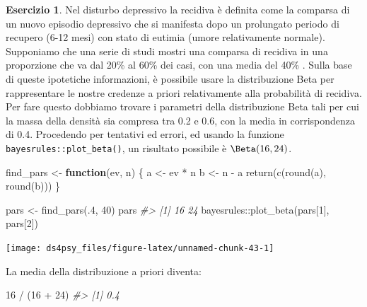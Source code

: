 \documentclass[
  11pt,
]{krantz}
\makeatletter
\newenvironment{Shaded}{\begin{snugshade}}{\end{snugshade}}
\newcommand{\CommentTok}[1]{\textcolor[rgb]{0.37,0.37,0.37}{\textit{#1}}}
\newcommand{\ControlFlowTok}[1]{\textcolor[rgb]{0.27,0.27,0.27}{\textbf{#1}}}
\newcommand{\DecValTok}[1]{\textcolor[rgb]{0.06,0.06,0.06}{#1}}
\newcommand{\FunctionTok}[1]{\textcolor[rgb]{0,0,0}{#1}}
\newcommand{\NormalTok}[1]{#1}
\newcommand{\OtherTok}[1]{\textcolor[rgb]{0.37,0.37,0.37}{#1}}
\newcommand{\SpecialCharTok}[1]{\textcolor[rgb]{0,0,0}{#1}}
\newenvironment{kframe}{%
\medskip{}
\setlength{\fboxsep}{.8em}
 \def\at@end@of@kframe{}%
 \ifinner\ifhmode%
  \def\at@end@of@kframe{\end{minipage}}%
  \begin{minipage}{\columnwidth}%
 \fi\fi%
 \def\FrameCommand##1{\hskip\@totalleftmargin \hskip-\fboxsep
 \colorbox{shadecolor}{##1}\hskip-\fboxsep
     \hskip-\linewidth \hskip-\@totalleftmargin \hskip\columnwidth}%
 \MakeFramed {\advance\hsize-\width
   \@totalleftmargin\z@ \linewidth\hsize
   \@setminipage}}%
 {\par\unskip\endMakeFramed%
 \at@end@of@kframe}
\renewenvironment{Shaded}{\begin{kframe}}{\end{kframe}}
\theoremstyle{definition}
\theoremstyle{definition}
\theoremstyle{definition}
\newtheorem{exercise}{Esercizio}[chapter]
\theoremstyle{definition}
\theoremstyle{remark}
\makeatother
\begin{document}
\begin{exercise}
Nel disturbo depressivo la recidiva è definita come la comparsa di un nuovo episodio depressivo che si manifesta dopo un prolungato periodo di recupero (6-12 mesi) con stato di eutimia (umore relativamente normale). Supponiamo che una serie di studi mostri una comparsa di recidiva in una proporzione che va dal 20\% al 60\% dei casi, con una media del 40\% \citep[per una recente discussione, si veda][]{nuggerud2020analysis}. Sulla base di queste ipotetiche informazioni, è possibile usare la distribuzione Beta per rappresentare le nostre credenze a priori relativamente alla probabilità di recidiva. Per fare questo dobbiamo trovare i parametri della distribuzione Beta tali per cui la massa della densità sia compresa tra 0.2 e 0.6, con la media in corrispondenza di 0.4. Procedendo per tentativi ed errori, ed usando la funzione \texttt{bayesrules::plot\_beta()}, un risultato possibile è \(\Beta(16, 24)\).

\begin{Shaded}
\begin{Highlighting}[]
\NormalTok{find\_pars }\OtherTok{\textless{}{-}} \ControlFlowTok{function}\NormalTok{(ev, n) \{}
\NormalTok{  a }\OtherTok{\textless{}{-}}\NormalTok{ ev }\SpecialCharTok{*}\NormalTok{ n}
\NormalTok{  b }\OtherTok{\textless{}{-}}\NormalTok{ n }\SpecialCharTok{{-}}\NormalTok{ a}
  \FunctionTok{return}\NormalTok{(}\FunctionTok{c}\NormalTok{(}\FunctionTok{round}\NormalTok{(a), }\FunctionTok{round}\NormalTok{(b)))}
\NormalTok{\}}

\NormalTok{pars }\OtherTok{\textless{}{-}} \FunctionTok{find\_pars}\NormalTok{(.}\DecValTok{4}\NormalTok{, }\DecValTok{40}\NormalTok{)}
\NormalTok{pars}
\CommentTok{\#\textgreater{} [1] 16 24}
\NormalTok{bayesrules}\SpecialCharTok{::}\FunctionTok{plot\_beta}\NormalTok{(pars[}\DecValTok{1}\NormalTok{], pars[}\DecValTok{2}\NormalTok{])}
\end{Highlighting}
\end{Shaded}

\begin{center}\texttt{[image: ds4psy\_files/figure-latex/unnamed-chunk-43-1]} \end{center}

La media della distribuzione a priori diventa:

\begin{Shaded}
\begin{Highlighting}[]
\DecValTok{16} \SpecialCharTok{/}\NormalTok{ (}\DecValTok{16} \SpecialCharTok{+} \DecValTok{24}\NormalTok{)}
\CommentTok{\#\textgreater{} [1] 0.4}
\end{Highlighting}
\end{Shaded}


\end{exercise}
\end{document}

